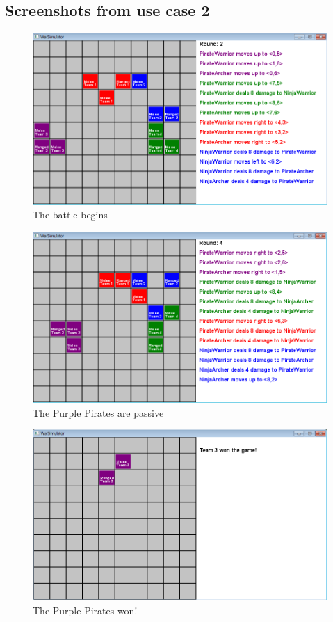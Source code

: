 	\subsection*{Screenshots from use case 2}
		\begin{figure}[H]
		\label{pic:case21}
			\center
			\includegraphics[scale=0.6]{rapport/7/figures/case2-1.png}
			\caption{The battle begins}
		\end{figure}
		\begin{figure}[H]
		\label{pic:case22}
		\center
			\includegraphics[scale=0.6]{rapport/7/figures/case2-2.png}
			\caption{The Purple Pirates are passive}
		\end{figure}
		\begin{figure}[H]
		\label{pic:case23}
		\center
			\includegraphics[scale=0.6]{rapport/7/figures/case2-3.png}
			\caption{The Purple Pirates won!}
		\end{figure}
	
